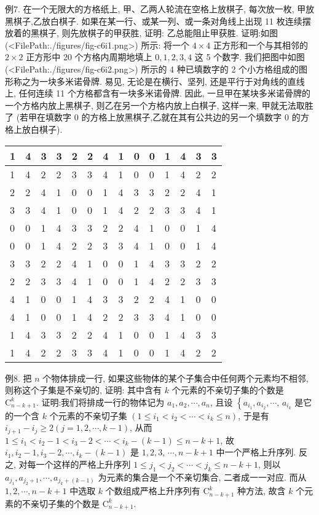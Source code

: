 例7. 在一个无限大的方格纸上, 甲、乙两人轮流在空格上放棋子, 每次放一枚, 甲放黑棋子,乙放白棋子.
如果在某一行、或某一列、或一条对角线上出现 11 枚连续摆放着的黑棋子, 则先放棋子的甲获胜, 证明: 乙总能阻止甲获胜.
证明:如图(<FilePath:./figures/fig-c6i1.png>) 所示: 将一个 $4 \times 4$ 正方形和一个与其相邻的 $2 \times 2$ 正方形中 20 个方格内周期地填上 $0,1,2,3,4$ 这 5 个数字.
我们把图中如图(<FilePath:./figures/fig-c6i2.png>) 所示的 4 种已填数字的 2 个小方格组成的图形称之为一块多米诺骨牌.
易见, 无论是在横行、坚列, 还是平行于对角线的直线上, 任何连续 11 个方格都含有一块多米诺骨牌.
因此, 一旦甲在某块多米诺骨牌的一个方格内放上黑棋子, 则乙在另一个方格内放上白棋子, 这样一来, 甲就无法取胜了 (若甲在填数字 0 的方格上放黑棋子,乙就在其有公共边的另一个填数字 0 的方格上放白棋子).
\begin{tabular}{|l|l|l|l|l|l|l|l|l|l|l|l|l|l|}
\hline 1 & 4 & 3 & 3 & 2 & 2 & 4 & 1 & 0 & 0 & 1 & 4 & 3 & 3 \\
\hline 1 & 4 & 2 & 2 & 3 & 3 & 4 & 1 & 0 & 0 & 1 & 4 & 2 & 2 \\
\hline 2 & 2 & 4 & 1 & 0 & 0 & 1 & 4 & 3 & 3 & 2 & 2 & 4 & 1 \\
\hline 3 & 3 & 4 & 1 & 0 & 0 & 1 & 4 & 2 & 2 & 3 & 3 & 4 & 1 \\
\hline 0 & 0 & 1 & 4 & 3 & 3 & 2 & 2 & 4 & 1 & 0 & 0 & 1 & 4 \\
\hline 0 & 0 & 1 & 4 & 2 & 2 & 3 & 3 & 4 & 1 & 0 & 0 & 1 & 4 \\
\hline 3 & 3 & 2 & 2 & 4 & 1 & 0 & 0 & 1 & 4 & 3 & 3 & 2 & 2 \\
\hline 2 & 2 & 3 & 3 & 4 & 1 & 0 & 0 & 1 & 4 & 2 & 2 & 3 & 3 \\
\hline 4 & 1 & 0 & 0 & 1 & 4 & 3 & 3 & 2 & 2 & 4 & 1 & 0 & 0 \\
\hline 4 & 1 & 0 & 0 & 1 & 4 & 2 & 2 & 3 & 3 & 4 & 1 & 0 & 0 \\
\hline 1 & 4 & 3 & 3 & 2 & 2 & 4 & 1 & 0 & 0 & 1 & 4 & 3 & 3 \\
\hline 1 & 4 & 2 & 2 & 3 & 3 & 4 & 1 & 0 & 0 & 1 & 4 & 2 & 2 \\
\hline
\end{tabular}



例8. 把 $n$ 个物体排成一行, 如果这些物体的某个子集合中任何两个元素均不相邻, 则称这个子集是不亲切的, 证明: 其中含有 $k$ 个元素的不亲切子集的个数是 $\mathrm{C}_{n-k+1}^k$. 
证明:我们将排成一行的物体记为 $a_1, a_2, \cdots, a_n$, 且设 $\left\{a_{i_1}, a_{i_2}, \cdots\right.$, $a_{i_k}$ 是它的一个含 $k$ 个元素的不亲切子集 $\left(1 \leqslant i_1<i_2<\cdots<i_k \leqslant n\right)$, 于是有 $i_{j+1}-i_j \geqslant 2(j=1,2, \cdots, k-1)$, 从而 $1 \leqslant i_1<i_2-1<i_3-2<\cdots< i_k-(k-1) \leqslant n-k+1$, 故 $i_1, i_2-1, i_3-2, \cdots, i_k-(k-1)$ 是 $1,2,3$, $\cdots, n-k+1$ 中一个严格上升序列.
反之, 对每一个这样的严格上升序列 $1 \leqslant j_1<j_2<\cdots<j_k \leqslant n-k+1$, 则以 $a_{j_1}, a_{j_2+1}, \cdots, a_{j_k+(k-1)}$ 为元素的集合是一个不亲切集合, 二者成一一对应.
而从 $1,2, \cdots, n-k+1$ 中选取 $k$ 个数组成严格上升序列有 $\mathrm{C}_{n-k+1}^k$ 种方法, 故含 $k$ 个元素的不亲切子集的个数是 $\mathrm{C}_{n-k+1}^k$.



